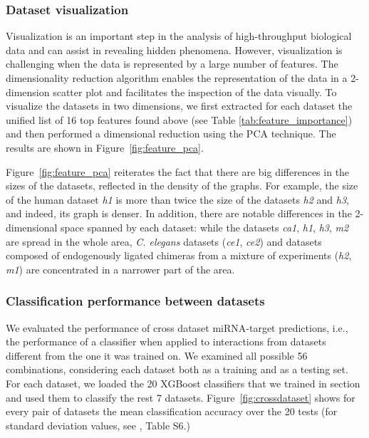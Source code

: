 \documentclass{bmcart}
\begin{document}
\subsubsection*{Dataset visualization}
Visualization is an important step in the analysis of high-throughput biological data and can assist in revealing hidden phenomena. However, visualization is challenging when the data is represented by a large number of features. The dimensionality reduction algorithm enables the representation of the data in a 2-dimension scatter plot and facilitates the inspection of the data visually. To visualize the datasets in two dimensions, we first extracted for each dataset the unified list of 16 top features found above (see Table \ref{tab:feature_importance}) and then performed a dimensional reduction using the PCA technique. The results are shown in Figure~\ref{fig:feature_pca}.


Figure~\ref{fig:feature_pca} reiterates the fact that there are big differences in the sizes of the datasets, reflected in the density of the graphs. For example, the size of the human dataset \textit{h1} is more than twice the size of the datasets \textit{h2} and \textit{h3}, and indeed, its graph is denser. In addition, there are notable differences in the 2-dimensional space spanned by each dataset: while the datasets \textit{ca1}, \textit{h1}, \textit{h3}, \textit{m2} are spread in the whole area, \textit{C. elegans} datasets (\textit{ce1}, \textit{ce2}) and datasets composed of endogenously ligated chimeras from a mixture of experiments (\textit{h2}, \textit{m1}) are concentrated in a narrower part of the area.

\subsubsection*{Classification performance between datasets}
We evaluated the performance of cross dataset miRNA-target predictions, i.e., the performance of a classifier when applied to interactions from datasets different from the one it was trained on.
We examined all possible 56 combinations, considering each dataset both as a training and as a testing set. 
For each dataset, we loaded the 20 XGBoost classifiers that we trained in section  and used them to classify the rest 7 datasets. Figure~\ref{fig:crossdataset} shows for every pair of datasets the mean classification accuracy over the 20 tests (for standard deviation values, see , Table S6.)
\end{document}
